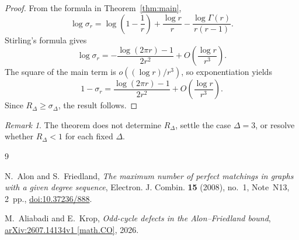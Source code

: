 \documentclass[11pt]{amsart}
\theoremstyle{remark}
\newtheorem{remark}[theorem]{Remark}
\begin{document}
\begin{proof}
From the formula in Theorem~\ref{thm:main},
\[
\log\sigma_r
=
\log\left(1-\frac1r\right)
+\frac{\log r}{r}
-\frac{\log\Gamma(r)}{r(r-1)}.
\]
Stirling's formula gives
\[
\log\sigma_r
=-\frac{\log(2\pi r)-1}{2r^2}
+O\left(\frac{\log r}{r^3}\right).
\]
The square of the main term is
$o((\log r)/r^3)$, so exponentiation yields
\[
1-\sigma_r
=
\frac{\log(2\pi r)-1}{2r^2}
+O\left(\frac{\log r}{r^3}\right).
\]
Since $R_\Delta\ge\sigma_\Delta$, the result follows.
\end{proof}

\begin{remark}
The theorem does not determine $R_\Delta$, settle the case $\Delta=3$, or
resolve whether $R_\Delta<1$ for each fixed $\Delta$.
\end{remark}

\begin{thebibliography}{9}

N.~Alon and S.~Friedland,
\emph{The maximum number of perfect matchings in graphs with a given degree sequence},
Electron. J. Combin. \textbf{15} (2008), no.~1, Note~N13, 2~pp.,
\href{https://doi.org/10.37236/888}{doi:10.37236/888}.

M.~Aliabadi and E.~Krop,
\emph{Odd-cycle defects in the Alon--Friedland bound},
\href{https://arxiv.org/abs/2607.14134v1}
{arXiv:2607.14134v1 [math.CO]}, 2026.

\end{thebibliography}
\end{document}
